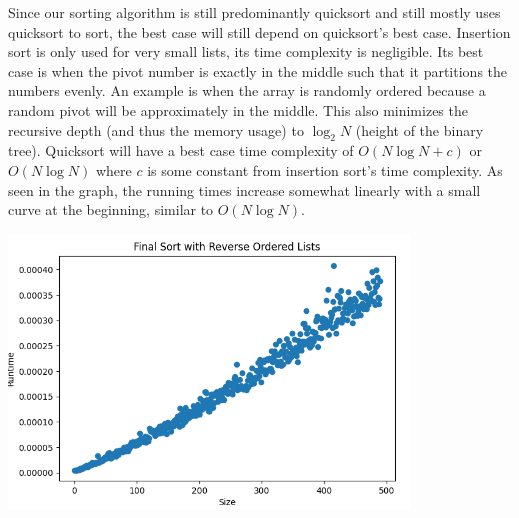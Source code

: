 \documentclass{article}
\begin{document}
Since our sorting algorithm is still predominantly quicksort and still mostly uses quicksort to sort, the best case will still depend on quicksort’s best case. Insertion sort is only used for very small lists, its time complexity is negligible. Its best case is when the pivot number is exactly in the middle such that it partitions the numbers evenly. An example is when the array is randomly ordered because a random pivot will be approximately in the middle. This also minimizes the recursive depth (and thus the memory usage) to $\log_2 N$ (height of the binary tree). Quicksort will have a best case time complexity of $O(N\log N + c)$ or $O(N\log N)$ where $c$ is some constant from insertion sort’s time complexity. As seen in the graph, the running times increase somewhat linearly with a small curve at the beginning, similar to $O(N\log N)$.

\includegraphics[width=0.8\textwidth]{finalSortRandomLists}
\end{document}
